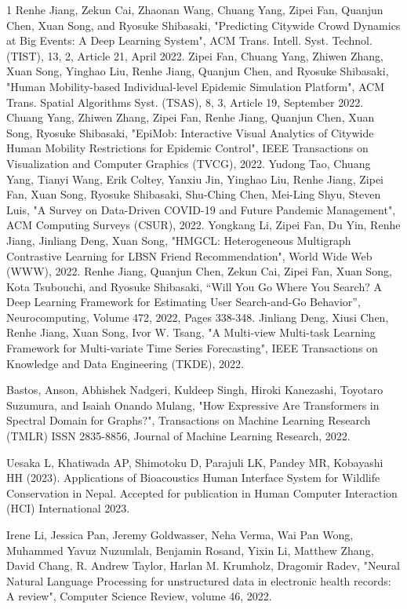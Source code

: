 \begin{雑誌論文}{1}
Renhe Jiang, Zekun Cai, Zhaonan Wang, Chuang Yang, Zipei Fan, Quanjun Chen, Xuan Song, and Ryosuke Shibasaki, "Predicting Citywide Crowd Dynamics at Big Events: A Deep Learning System", ACM Trans. Intell. Syst. Technol. (TIST), 13, 2, Article 21, April 2022.
Zipei Fan, Chuang Yang, Zhiwen Zhang, Xuan Song, Yinghao Liu, Renhe Jiang, Quanjun Chen, and Ryosuke Shibasaki, "Human Mobility-based Individual-level Epidemic Simulation Platform", ACM Trans. Spatial Algorithms Syst. (TSAS), 8, 3, Article 19, September 2022.
Chuang Yang, Zhiwen Zhang, Zipei Fan, Renhe Jiang, Quanjun Chen, Xuan Song, Ryosuke Shibasaki, "EpiMob: Interactive Visual Analytics of Citywide Human Mobility Restrictions for Epidemic Control", IEEE Transactions on Visualization and Computer Graphics (TVCG), 2022.
Yudong Tao, Chuang Yang, Tianyi Wang, Erik Coltey, Yanxiu Jin, Yinghao Liu, Renhe Jiang, Zipei Fan, Xuan Song, Ryosuke Shibasaki, Shu-Ching Chen, Mei-Ling Shyu, Steven Luis, "A Survey on Data-Driven COVID-19 and Future Pandemic Management", ACM Computing Surveys (CSUR), 2022.
Yongkang Li, Zipei Fan, Du Yin, Renhe Jiang, Jinliang Deng, Xuan Song, "HMGCL: Heterogeneous Multigraph Contrastive Learning for LBSN Friend Recommendation", World Wide Web (WWW), 2022.
Renhe Jiang, Quanjun Chen, Zekun Cai, Zipei Fan, Xuan Song, Kota Tsubouchi, and Ryosuke Shibasaki, “Will You Go Where You Search? A Deep Learning Framework for Estimating User Search-and-Go Behavior”, Neurocomputing, Volume 472, 2022, Pages 338-348.
Jinliang Deng, Xiusi Chen, Renhe Jiang, Xuan Song, Ivor W. Tsang, "A Multi-view Multi-task Learning Framework for Multi-variate Time Series Forecasting", IEEE Transactions on Knowledge and Data Engineering (TKDE), 2022.


Bastos, Anson, Abhishek Nadgeri, Kuldeep Singh, Hiroki Kanezashi, Toyotaro Suzumura, and Isaiah Onando Mulang, "How Expressive Are Transformers in Spectral Domain for Graphs?", Transactions on Machine Learning Research (TMLR) ISSN 2835-8856, Journal of Machine Learning Research, 2022.

Uesaka L, Khatiwada AP, Shimotoku D, Parajuli LK, Pandey MR, Kobayashi HH (2023). Applications of Bioacoustics Human Interface System for Wildlife Conservation in Nepal. Accepted for publication in Human Computer Interaction (HCI) International 2023.


Irene Li, Jessica Pan, Jeremy Goldwasser, Neha Verma, Wai Pan Wong, Muhammed Yavuz Nuzumlalı, Benjamin Rosand, Yixin Li, Matthew Zhang, David Chang, R. Andrew Taylor, Harlan M. Krumholz, Dragomir Radev, "Neural Natural Language Processing for unstructured data in electronic health records: A review", Computer Science Review, volume 46, 2022.

\end{雑誌論文}

